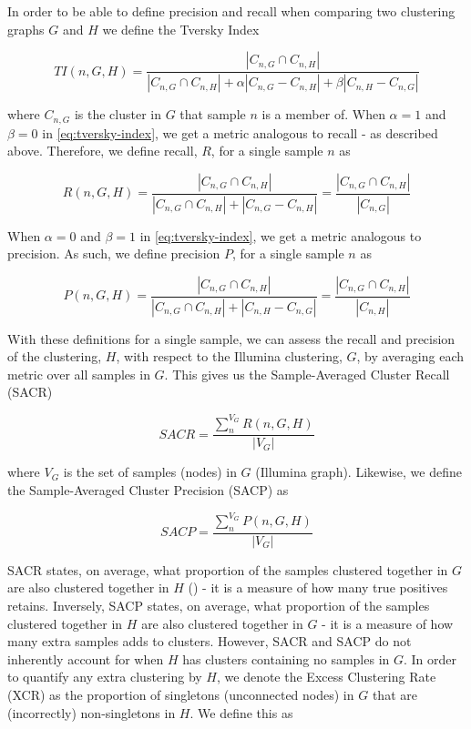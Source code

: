In order to be able to define precision and recall when comparing two clustering graphs $G$ and $H$ we define the Tversky Index

\begin{equation}
\label{eq:tversky-index}
   TI(n, G, H)=\frac{\left|C_{n,G}\cap C_{n,H}\right|}{\left|C_{n,G}\cap C_{n,H}\right|+\alpha |C_{n,G}-C_{n,H}|+\beta |C_{n,H}-C_{n,G}|}
\end{equation}

where $C_{n,G}$ is the cluster in $G$ that sample $n$ is a member of. When $\alpha = 1$ and $\beta=0$ in \autoref{eq:tversky-index}, we get a metric analogous to recall - as described above. Therefore, we define recall, $R$, for a single sample $n$ as

\begin{equation}
\label{eq:recall}
   R(n, G, H)=\frac{\left|C_{n,G}\cap C_{n,H}\right|}{\left|C_{n,G}\cap C_{n,H}\right|+|C_{n,G}-C_{n,H}|}=\frac{\left|C_{n,G}\cap C_{n,H}\right|}{|C_{n,G}|}
\end{equation}

When $\alpha = 0$ and $\beta = 1$ in \autoref{eq:tversky-index}, we get a metric analogous to precision. As such, we define precision $P$, for a single sample $n$ as

\begin{equation}
\label{eq:precision}
   P(n, G, H)=\frac{\left|C_{n,G}\cap C_{n,H}\right|}{\left|C_{n,G}\cap C_{n,H}\right|+|C_{n,H}-C_{n,G}|}=\frac{\left|C_{n,G}\cap C_{n,H}\right|}{|C_{n,H}|}
\end{equation}

With these definitions for a single sample, we can assess the recall and precision of the \ont{} clustering, $H$, with respect to the Illumina clustering, $G$, by averaging each metric over all samples in $G$. This gives us the Sample-Averaged Cluster Recall (SACR)

\begin{equation}
\label{eq:sacr}
   SACR=\frac{\sum_{n}^{V_G}R(n, G, H)}{|V_G|}
\end{equation}

where $V_G$ is the set of samples (nodes) in $G$ (Illumina graph). Likewise, we define the Sample-Averaged Cluster Precision (SACP) as 

\begin{equation}
\label{eq:sacp}
   SACP=\frac{\sum_{n}^{V_G}P(n, G, H)}{|V_G|}
\end{equation}

SACR states, on average, what proportion of the samples clustered together in $G$ are also clustered together in $H$ (\ont{}) - it is a measure of how many true positives \ont{} retains. Inversely, SACP states, on average, what proportion of the samples clustered together in $H$ are also clustered together in $G$ - it is a measure of how many extra samples \ont{} adds to clusters. However, SACR and SACP do not inherently account for when $H$ has clusters containing no samples in $G$. In order to quantify any extra clustering by $H$, we denote the Excess Clustering Rate (XCR) as the proportion of singletons (unconnected nodes) in $G$ that are (incorrectly) non-singletons in $H$. We define this as

